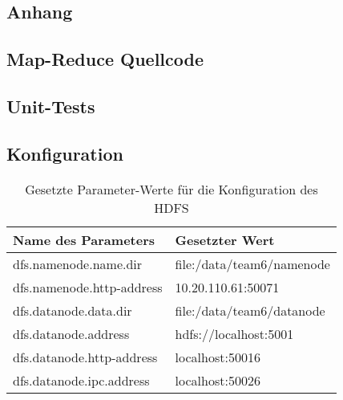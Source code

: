 \begin{appendices}
\chapter{Anhang}
\section{Map-Reduce Quellcode}






\section{Unit-Tests}







\section{Konfiguration}

\begin{table}
	\begin{tabularx}{\textwidth}{| X | X |} \hline
		Name des Parameters & Gesetzter Wert \\ \hline
		dfs.namenode.name.dir & file:/data/team6/namenode \\ \hline
		dfs.namenode.http-address & 10.20.110.61:50071  \\ \hline
		dfs.datanode.data.dir & file:/data/team6/datanode \\ \hline
		dfs.datanode.address & hdfs://localhost:5001 \\ \hline
		dfs.datanode.http-address & localhost:50016 \\ \hline
		dfs.datanode.ipc.address & localhost:50026 \\ \hline
	\end{tabularx}
	\caption{Gesetzte Parameter-Werte für die Konfiguration des HDFS}
	\label{config:hdfsValues}
\end{table}


\end{appendices}
